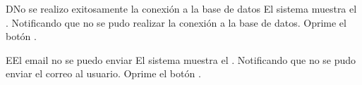		\begin{UCtrayectoriaA}{D}{No se realizo exitosamente la conexión a la base de datos}
			\UCpaso[\UCsist] El sistema muestra el . Notificando que no se pudo realizar la conexión a la base de datos.
			\UCpaso[\UCactor] Oprime el botón .
		\end{UCtrayectoriaA}
		
		\begin{UCtrayectoriaA}{E}{El email no se puedo enviar}
			\UCpaso[\UCsist] El sistema muestra el . Notificando que no se pudo enviar el correo al usuario.
			\UCpaso[\UCactor] Oprime el botón .
		\end{UCtrayectoriaA}
		

